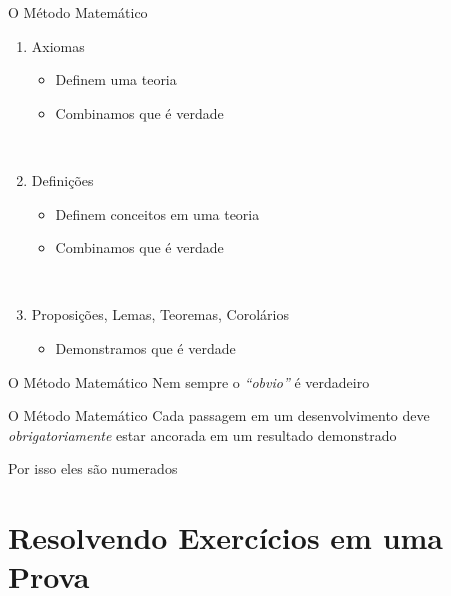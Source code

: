 \documentclass[fleqn,utf8,aspectratio=169,12pt]{beamer}
\begin{document}
\begin{frame}{O Método Matemático}
  \begin{enumerate}[<+->]
    \item Axiomas
    \begin{itemize}
      \item Definem uma teoria
      \item Combinamos que é verdade
    \end{itemize}
    ~

    \item Definições
    \begin{itemize}
      \item Definem conceitos em uma teoria
      \item Combinamos que é verdade
    \end{itemize}
    ~

    \item Proposições, Lemas, Teoremas, Corolários
    \begin{itemize}
      \item Demonstramos que é verdade
    \end{itemize}
  \end{enumerate}
\end{frame}

\begin{frame}{O Método Matemático}
  Nem sempre o \textit{``obvio''} é verdadeiro
\end{frame}

\begin{frame}{O Método Matemático}
  Cada passagem em um desenvolvimento deve \\
  \emph{obrigatoriamente}
  estar ancorada em um resultado demonstrado

  \pause
  \bigskip
  Por isso eles são numerados
\end{frame}

\section{Resolvendo Exercícios em uma Prova}
\end{document}
